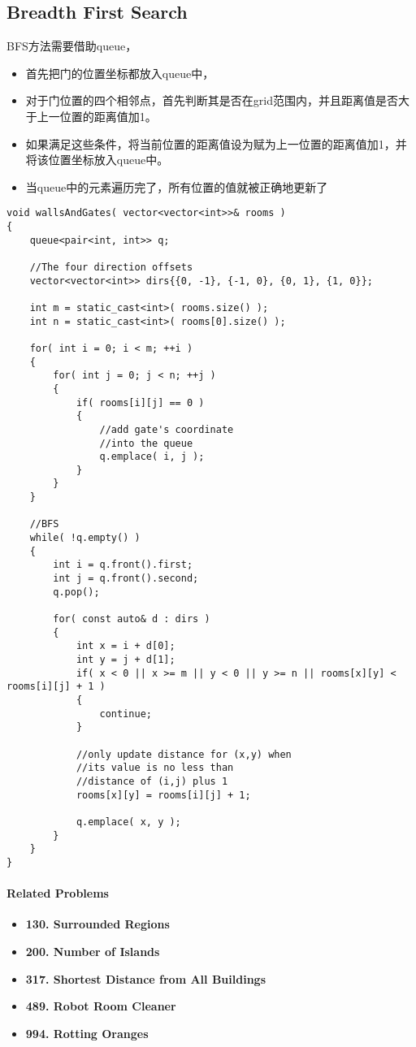 \subsection{Breadth First Search}
BFS方法需要借助queue，
\begin{itemize}
\item 首先把门的位置坐标都放入queue中，
\item 对于门位置的四个相邻点，首先判断其是否在grid范围内，并且距离值是否大于上一位置的距离值加1。
\item 如果满足这些条件，将当前位置的距离值设为赋为上一位置的距离值加1，并将该位置坐标放入queue中。
\item 当queue中的元素遍历完了，所有位置的值就被正确地更新了
\end{itemize}
\begin{lstlisting}[style=customc, caption={BFS}]
void wallsAndGates( vector<vector<int>>& rooms )
{
    queue<pair<int, int>> q;

    //The four direction offsets
    vector<vector<int>> dirs{{0, -1}, {-1, 0}, {0, 1}, {1, 0}};

    int m = static_cast<int>( rooms.size() );
    int n = static_cast<int>( rooms[0].size() );

    for( int i = 0; i < m; ++i )
    {
        for( int j = 0; j < n; ++j )
        {
            if( rooms[i][j] == 0 )
            {
                //add gate's coordinate
                //into the queue
                q.emplace( i, j );
            }
        }
    }

    //BFS
    while( !q.empty() )
    {
        int i = q.front().first;
        int j = q.front().second;
        q.pop();

        for( const auto& d : dirs )
        {
            int x = i + d[0];
            int y = j + d[1];
            if( x < 0 || x >= m || y < 0 || y >= n || rooms[x][y] < rooms[i][j] + 1 )
            {
                continue;
            }

            //only update distance for (x,y) when
            //its value is no less than
            //distance of (i,j) plus 1
            rooms[x][y] = rooms[i][j] + 1;

            q.emplace( x, y );
        }
    }
}
\end{lstlisting}

\paragraph{Related Problems}
\begin{itemize}
\item \textbf{130. Surrounded Regions}
\item \textbf{200. Number of Islands}
\item \textbf{317. Shortest Distance from All Buildings}
\item \textbf{489. Robot Room Cleaner}
\item \textbf{994. Rotting Oranges}
\end{itemize}

